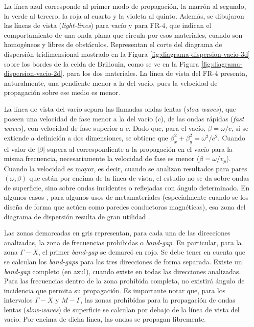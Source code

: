 La línea azul corresponde al primer modo de propagación, la marrón al segundo, la verde al tercero, la roja al cuarto y la violeta al quinto. Además, se dibujaron las líneas de vista (\textit{light-lines}) para vacío y para FR-4, que indican el comportamiento de una onda plana que circula por esos materiales, cuando son homogéneos y libres de obstáculos. Representan el corte del diagrama de dispersión tridimensional mostrado en la Figura \ref{fig:diagrama-dispersion-vacio-3d} sobre los bordes de la celda de Brillouin, como se ve en la Figura \ref{fig:diagrama-dispersion-vacio-2d}, para los dos materiales. La línea de vista del FR-4 presenta, naturalmente, una pendiente menor a la del vacío, pues la velocidad de propagación sobre ese medio es menor.

La línea de vista del vacío separa las llamadas ondas lentas (\textit{slow waves}), que poseen una velocidad de fase menor a la del vacío ($c$), de las ondas rápidas (\textit{fast waves}), con velocidad de fase superior a $c$. Dado que, para el vacío, $\beta=\omega/c$, si se extiende a definición a dos dimensiones, se obtiene que $\beta_x^2 + \beta_y^2 = \omega^2/c^2$. Cuando el valor de $|\beta|$ supera al correspondiente a la propagación en el vacío para la misma frecuencia, necesariamente la velocidad de fase es menor ($\beta = \omega / v_p$). Cuando la velocidad es mayor, es decir, cuando se analizan resultados para pares $(\omega,\beta)$ que están por encima de la línea de vista, el estudio no se da sobre ondas de superficie, sino sobre ondas incidentes o reflejadas con ángulo determinado. En algunos casos \cite{Maci:Pole-zero-matching}, para algunos usos de metamateriales (especialmente cuando se los diseña de forma que actúen como paredes conductoras magnéticas), esa zona del diagrama de dispersión resulta de gran utilidad \cite{Yang:EBGAntennas}.

Las zonas demarcadas en gris representan, para cada una de las direcciones analizadas, la zona de frecuencias prohibidas o \textit{band-gap}. En particular, para la zona $\Gamma-X$, el primer \textit{band-gap} se demarcó en rojo. Se debe tener en cuenta que se calculan los \textit{band-gaps} para  las tres direcciones de forma separada. Existe un \textit{band-gap} completo (en azul), cuando existe en todas las direcciones analizadas. Para las frecuencias dentro de la zona prohibida completa, no existirá ángulo de incidencia que permita su propagación. Es importante notar que, para los intervalos $\Gamma-X$ y $M-\Gamma$, las zonas prohibidas para la propagación de ondas lentas (\textit{slow-waves}) de superficie se calculan por debajo de la línea de vista del vacío. Por encima de dicha línea, las ondas se propagan libremente.

